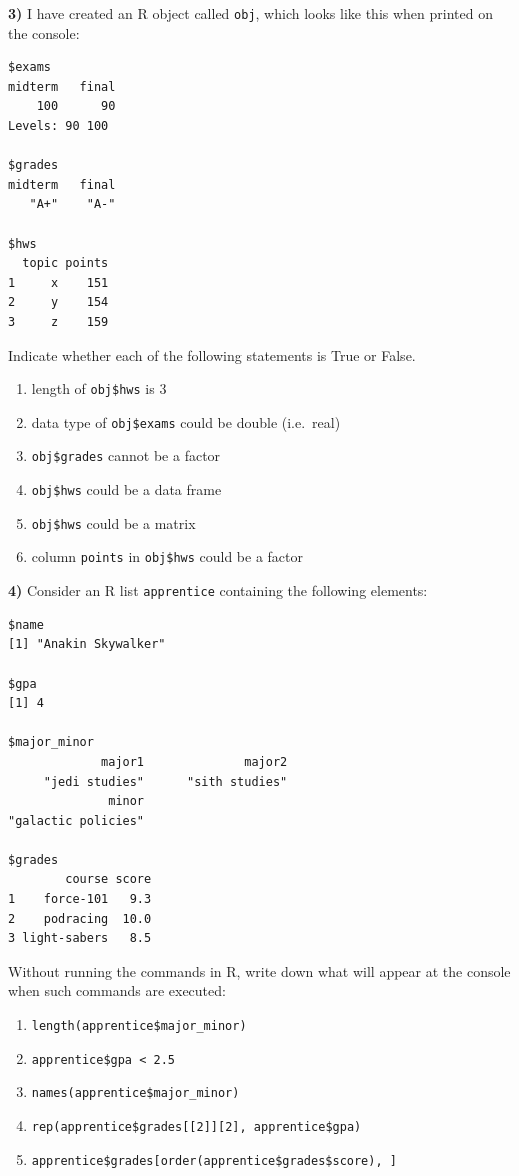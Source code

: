 \documentclass[
]{book}
\begin{document}
\textbf{3)} I have created an R object called \texttt{obj}, which looks like this when
printed on the console:

\begin{verbatim}
$exams
midterm   final 
    100      90 
Levels: 90 100

$grades
midterm   final 
   "A+"    "A-" 

$hws
  topic points
1     x    151
2     y    154
3     z    159
\end{verbatim}

Indicate whether each of the following statements is True or False.

\begin{enumerate}
\def\labelenumi{\alph{enumi})}
\item
  length of \texttt{obj\$hws} is 3
\item
  data type of \texttt{obj\$exams} could be double (i.e.~real)
\item
  \texttt{obj\$grades} cannot be a factor
\item
  \texttt{obj\$hws} could be a data frame
\item
  \texttt{obj\$hws} could be a matrix
\item
  column \texttt{points} in \texttt{obj\$hws} could be a factor
\end{enumerate}

\textbf{4)} Consider an R list \texttt{apprentice} containing the following elements:

\begin{verbatim}
$name
[1] "Anakin Skywalker"

$gpa
[1] 4

$major_minor
             major1              major2 
     "jedi studies"      "sith studies" 
              minor 
"galactic policies" 

$grades
        course score
1    force-101   9.3
2    podracing  10.0
3 light-sabers   8.5
\end{verbatim}

Without running the commands in R, write down what will appear at the console
when such commands are executed:

\begin{enumerate}
\def\labelenumi{\alph{enumi})}
\item
  \texttt{length(apprentice\$major\_minor)}
\item
  \texttt{apprentice\$gpa\ \textless{}\ 2.5}
\item
  \texttt{names(apprentice\$major\_minor)}
\item
  \texttt{rep(apprentice\$grades{[}{[}2{]}{]}{[}2{]},\ apprentice\$gpa)}
\item
  \texttt{apprentice\$grades{[}order(apprentice\$grades\$score),\ {]}}
\end{enumerate}
\end{document}

